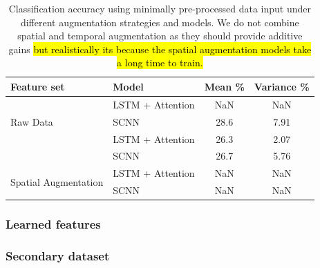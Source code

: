 \documentclass[utf8]{frontiersSCNS} %
\begin{document}
\begin{table}[t]
  \centering
  \label{tab:end2end_results}
  \begin{tabular}{l l | c | c}
    \toprule
    \textbf{Feature set} & \textbf{Model} & \textbf{Mean \%} & \textbf{Variance \%} \\
    \toprule
    \multirow{3}{*}{Raw Data}
                         & LSTM + Attention    & NaN & NaN  \\ 
                         & SCNN                & 28.6 & 7.91  \\
    \midrule
    \multirow{3}{*}{Temporal Augmentation}
                         & LSTM + Attention    & 26.3 & 2.07  \\ 
                         & SCNN                & 26.7 & 5.76  \\
    \midrule
    \multirow{3}{*}{Spatial Augmentation}
                         & LSTM + Attention    & NaN & NaN  \\ 
                         & SCNN                & NaN & NaN  \\
    
    \bottomrule
  \end{tabular}
  \caption{Classification accuracy using minimally pre-processed data input under different augmentation strategies and models. We do not combine spatial and temporal augmentation as they should provide additive gains \hl{but realistically its because the spatial augmentation models take a long time to train.}}
\end{table}

\subsubsection{Learned features}

\subsubsection{Secondary dataset}
\end{document}
